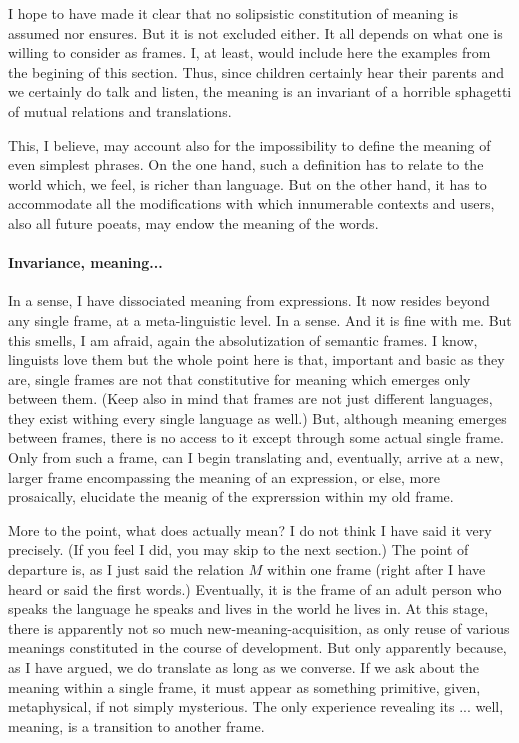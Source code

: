 \documentclass[10pt]{article}
\begin{document}
I hope to have made it clear that no solipsistic constitution of meaning 
is assumed nor ensures. But it is not excluded either. It all depends on 
what one is willing to consider as frames. I, at least, would include here 
the examples from the begining of this section. Thus, since children 
certainly hear their parents and we certainly do talk and listen, the 
meaning is an invariant of a horrible sphagetti of mutual relations and 
translations. 

This, I believe, may account 
also for the impossibility to define the meaning of even simplest phrases. 
On the one hand, such a definition has to relate to the world which, we feel, is richer 
than language. But on the other hand, it has to accommodate all the 
modifications with which innumerable contexts and users, also all future poeats,
may  endow the meaning of the words.



\paragraph{Invariance, meaning...}
In a sense, I have dissociated meaning from expressions. It now resides 
beyond any single frame, at a meta-linguistic level. In a sense. And it is 
fine with me. But this smells, I am afraid, again the absolutization of semantic 
frames. I know, linguists love them but the whole point here is that, 
important and basic as they are, single frames are not that constitutive for 
meaning which emerges only between them. 
(Keep also in mind that frames are not just different languages, 
they exist withing every single language as well.) 
But, although meaning emerges between frames, there is 
no access to it except through some actual single frame. Only 
from such a frame, can I begin translating and, eventually, arrive 
at a new, larger frame encompassing the meaning of an expression, or else, 
more prosaically, elucidate the meanig of the exprerssion within my old 
frame.

More to the point, what does  actually mean? I do not think 
I have said it very precisely. (If you feel I did, you may skip to the next 
section.) The point of departure is, as I just said the relation $M$ within 
one frame (right after I have heard or said the first words.) Eventually, 
it is the frame of an adult person who speaks the language he speaks and 
lives in the world he lives in. At this stage, there is apparently not so much 
new-meaning-acquisition, as only reuse of various meanings constituted in the 
course of development. But only apparently because, as I have argued, we 
do translate as long as we converse. If we ask about the meaning within a 
single frame, it must appear as something primitive, given, metaphysical, 
if not simply mysterious. The only experience revealing its ... well, 
meaning, is a transition to another frame. 
\end{document}

